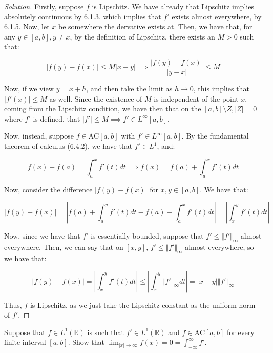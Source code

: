 \documentclass[10pt]{article}
\newcommand{\ac}{{\text{AC}}}
\newenvironment{problem}[2][Problem]{\begin{trivlist}
\item[\hskip \labelsep {\bfseries #1}\hskip \labelsep {\bfseries #2.}]}{\end{trivlist}}
\begin{document}
\begin{proof}[Solution]

Firstly, suppose $f$ is Lipschitz. We have already that Lipschitz implies absolutely continuous by 6.1.3, which implies that $f'$ exists almost everywhere, by 6.1.5. Now, let $x$ be somewhere the dervative exists at. Then, we have that, for any $y \in [a,b], y \not = x$, by the definition of Lipschitz, there exists an $M > 0$ such that:

$$ | f(y) - f(x) | \leq M | x - y| \implies \frac{|f(y)- f(x)|}{|y-x|} \leq M $$

Now, if we view $y = x+h$, and then take the limit as $h \to 0$, this implies that $|f'(x)| \leq M$ as well. Since the existence of $M$ is independent of the point $x$, coming from the Lipschitz condition, we have then that on the $[a,b] \setminus Z, |Z|= 0$ where $f'$ is defined, that $|f' | \leq M \implies f' \in L^\infty[a,b]$.

Now, instead, suppose $f \in \ac[a,b]$ with $f' \in L^\infty[a,b]$. By the fundamental theorem of calculus (6.4.2), we have that $f' \in L^1$, and:

$$ f(x) - f(a) = \int_a^x f'(t) dt  \implies f(x) = f(a) + \int_a^x f'(t)dt$$

Now, consider the difference $| f(y) - f(x) |$ for $x,y \in [a,b]$. We have that:

$$ | f(y) - f(x) |  = \left| f(a) + \int_a^y f'(t) dt - f(a) - \int_a^x f'(t) dt \right| = \left| \int_x^y f'(t) dt \right|$$

Now, since we have that $f'$ is essentially bounded, suppose that $f' \leq \Vert f' \Vert_\infty$ almost everywhere. Then, we can say that on $[x,y]$, $f' \leq \Vert f' \Vert_\infty$ almost everywhere, so we have that:

$$ |f(y) - f(x)| =  \left| \int_x^y f'(t) dt \right| \leq \left| \int_x^y \Vert f' \Vert_\infty dt \right| = |x - y| \Vert f' \Vert_\infty $$

Thus, $f$ is Lipschitz, as we just take the Lipschitz constant as the uniform norm of $f'$.

\end{proof}

\begin{problem}{6.4.13}

Suppose that $f \in L^1(\mathbb{R})$ is such that $f'\in L^1(\mathbb{R})$ and $ f \in \ac[a,b]$ for every finite interval $[a,b]$. Show that $\lim_{|x| \to \infty} f(x) = 0 = \int_{-\infty}^\infty f'$. 

\end{problem}
\end{document}
